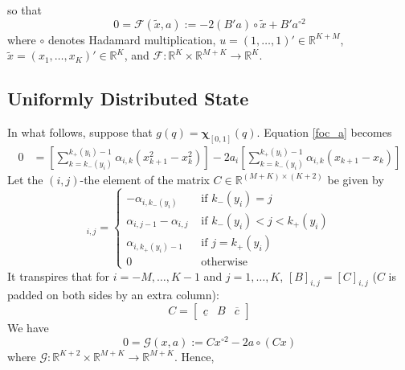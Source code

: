 \documentclass[12pt]{article}
\begin{document}
so that
\begin{equation}
	0=\mathcal{F}(\widetilde{x},a):=-2(B'a)\circ\widetilde{x}+B'a^{\circ 2}\label{eq:F_map}
\end{equation}
where $\circ$ denotes Hadamard multiplication, $u=(1,\ldots,1)'\in\mathbb{R}^{K+M}$, $\widetilde{x}=(x_{1},\ldots,x_{K})'\in\mathbb{R}^{K}$, and $\mathcal{F}:\mathbb{R}^{K}\times\mathbb{R}^{M+K}\rightarrow\mathbb{R}^{K}$. 
\subsection{Uniformly Distributed State}
In what follows, suppose that $g(q)=\mathbf{\chi}_{[0,1]}(q)$. Equation \ref{foc_a} becomes
\begin{align}
	0&=\left[\sum_{k=k_{-}(y_{i})}^{k_{+}(y_{i})-1}{\alpha_{i,k}\left(x_{k+1}^{2}-x_{k}^{2}\right)}\right]-2a_{i}\left[\sum_{k=k_{-}(y_{i})}^{k_{+}(y_{i})-1}{\alpha_{i,k}(x_{k+1}-x_{k})}\right]
\end{align}
Let the $(i,j)$-the element of the matrix $C\in\mathbb{R}^{(M+K)\times(K+2)}$ be given by
\begin{equation}
	[C]_{i,j}=
	\begin{cases}
		-\alpha_{i,k_{-}(y_{i})} & \text{ if } k_{-}(y_{i})=j \\
		\alpha_{i,j-1}-\alpha_{i,j} & \text{ if } k_{-}(y_{i})<j<k_{+}(y_{i})\\
		\alpha_{i,k_{+}(y_{i})-1} & \text{ if } j=k_{+}(y_{i})\\
		0 & \text{ otherwise }
	\end{cases}
\end{equation}
It transpires that for $i=-M,\ldots,K-1$ and $j=1,\ldots,K$, $[B]_{i,j}=[C]_{i,j}$ ($C$ is padded on both sides by an extra column): 
\begin{equation}
	C = 
	\left[
		\begin{array}{ccc}
			\underline{c} & B & \overline{c}
		\end{array}
	\right]
\end{equation}
We have 
\begin{equation}\label{eq:G_map}
	0=\mathcal{G}(x,a):=Cx^{\circ 2}-2a\circ (Cx)
\end{equation}
where $\mathcal{G}:\mathbb{R}^{K+2}\times\mathbb{R}^{M+K}\rightarrow\mathbb{R}^{M+K}$. Hence,
\end{document}
